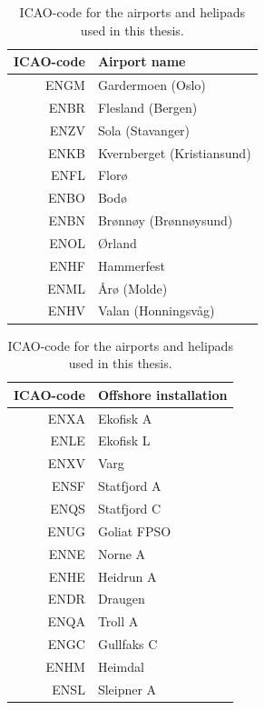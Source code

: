 \begin{table}
    \begin{subtable}[h]{0.45\textwidth}
        \centering
         \begin{tabular}{r|l}
            ICAO-code & Airport name \\
            \hline
            ENGM & Gardermoen (Oslo) \\
            ENBR & Flesland (Bergen) \\
            ENZV & Sola (Stavanger)  \\
            ENKB & Kvernberget (Kristiansund) \\
            ENFL & Florø \\
            ENBO & Bodø \\
            ENBN & Brønnøy (Brønnøysund) \\
            ENOL & Ørland \\
            ENHF & Hammerfest \\
            ENML & Årø (Molde)\\
            ENHV & Valan (Honningsvåg)\\
        \end{tabular}
    \end{subtable}
    \hfill
    \begin{subtable}[h]{0.45\textwidth}
        \centering
        \begin{tabular}{r|l}
            ICAO-code & Offshore installation\\
            \hline
            ENXA &  Ekofisk A\\
            ENLE &  Ekofisk L\\
            ENXV &  Varg\\
            ENSF &  Statfjord A\\
            ENQS &  Statfjord C\\
            ENUG &  Goliat FPSO\\
            ENNE &  Norne A\\
            ENHE &  Heidrun A\\
            ENDR &  Draugen\\
            ENQA &  Troll A\\
            ENGC &  Gullfaks C\\
            ENHM &  Heimdal\\
            ENSL &  Sleipner A\\
        \end{tabular}
     \end{subtable}
    \caption{ICAO-code for the airports and helipads used in this thesis.}
    \label{tab:ICAO-table}
\end{table}